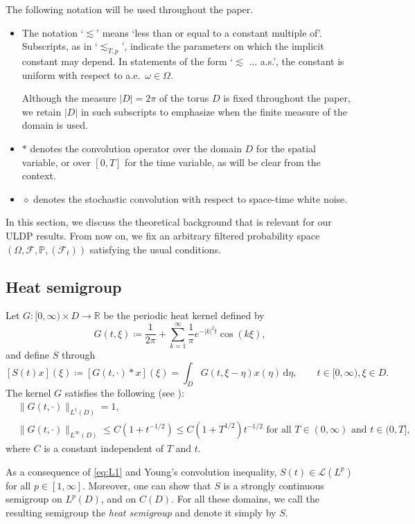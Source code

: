 \documentclass[10pt,a4paper]{amsart}
\numberwithin{equation}{section}
\newcommand{\R}{\mathbb{R}}
\newcommand{\ceqq}{\coloneqq}
\newcommand{\col}{\colon}
\renewcommand{\P}{{\mathbb P}}
\newcommand{\F}{{\mathscr F}}
\newcommand{\Om}{\Omega}
\newcommand{\om}{\omega}
\newcommand{\calL}{\mathcal{L}}
\newcommand{\dd}{\,\mathrm{d}}
\begin{document}
The following notation will be used throughout the paper.
\begin{itemize}
\item The notation `$\lesssim$' means `less than or equal to a constant multiple of'. Subscripts, as in `$\lesssim_{T,p}$', indicate the parameters on which the implicit constant may depend. 
In statements of the form `$\lesssim$ ... a.s.', the constant is uniform with respect to a.e.\ $\om\in\Om$.

Although the measure $|D|=2\pi$ of the torus $D$ is fixed throughout the paper, we retain $|D|$ in such subscripts to emphasize when the finite measure of the domain is used.  
\item $*$ denotes the convolution operator over the domain $D$ for the spatial variable, or over $[0,T]$ for the time variable, as will be clear from the context.  
\item $\diamond$ denotes the stochastic convolution with respect to space-time white noise. 
\end{itemize}  

In this section, we discuss the    theoretical background that is relevant for our ULDP results. From now on, we fix an arbitrary filtered probability space $(\Om,\F,\P,(\F_t))$ satisfying the usual conditions. 

\subsection{Heat semigroup}\label{sub:heatkernel}

Let $G\col[0,\infty)\times D\to \R$ be the periodic heat kernel defined by 
\[
G(t,\xi)\ceqq  \frac{1}{2\pi} + \sum_{k=1}^{\infty} {\frac{1}{\pi}} e^{-|k|^2 t} \cos(k\xi),
\]
and define $S$ through 
\[
[S(t)x](\xi) \ceqq [G(t,\cdot)*x](\xi)=\int_D G(t,\xi-\eta)x(\eta)\dd \eta, \qquad t\in[0,\infty), \xi\in D.
\]
The kernel $G$ satisfies the following (see \cite[Lem.\ 2.1]{Salins25SHE}):  
\begin{align} 
  &\|G(t,\cdot)\|_{L^1(D)}=1,\label{eq:L1}\\
  &\|G(t,\cdot)\|_{L^\infty(D)}\leq C(1+t^{-1/2})\leq C(1+T^{1/2})t^{-1/2} \text{ for all $T\in(0,\infty)$ and $t\in(0,T]$,} \label{eq:Linfty}
\end{align}where $C$ is a constant independent of $T$ and $t$. 

As a consequence of \eqref{eq:L1} and Young's convolution inequality, $S(t)\in \calL(L^p)$ for all $p\in [1,\infty]$. Moreover, one can show that $S$ is a strongly continuous semigroup on $L^p(D)$, and on $C(D)$. For all these domains, we call the resulting semigroup the \emph{heat semigroup} and denote it simply by $S$. 
\end{document}
